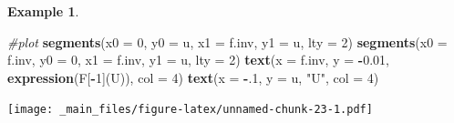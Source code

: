 \documentclass[
]{book}
\newenvironment{Shaded}{\begin{snugshade}}{\end{snugshade}}
\newcommand{\AttributeTok}[1]{\textcolor[rgb]{0.13,0.29,0.53}{#1}}
\newcommand{\CommentTok}[1]{\textcolor[rgb]{0.56,0.35,0.01}{\textit{#1}}}
\newcommand{\DecValTok}[1]{\textcolor[rgb]{0.00,0.00,0.81}{#1}}
\newcommand{\FloatTok}[1]{\textcolor[rgb]{0.00,0.00,0.81}{#1}}
\newcommand{\FunctionTok}[1]{\textcolor[rgb]{0.13,0.29,0.53}{\textbf{#1}}}
\newcommand{\NormalTok}[1]{#1}
\newcommand{\SpecialCharTok}[1]{\textcolor[rgb]{0.81,0.36,0.00}{\textbf{#1}}}
\newcommand{\StringTok}[1]{\textcolor[rgb]{0.31,0.60,0.02}{#1}}
\theoremstyle{definition}
\theoremstyle{definition}
\newtheorem{example}{Example}[chapter]
\theoremstyle{definition}
\theoremstyle{definition}
\theoremstyle{remark}
\begin{document}
\begin{example}
\begin{Shaded}
\begin{Highlighting}[]
\CommentTok{\#plot }
\FunctionTok{segments}\NormalTok{(}\AttributeTok{x0 =} \DecValTok{0}\NormalTok{, }\AttributeTok{y0 =}\NormalTok{ u, }\AttributeTok{x1 =}\NormalTok{ f.inv, }\AttributeTok{y1 =}\NormalTok{ u, }\AttributeTok{lty =} \DecValTok{2}\NormalTok{)}
\FunctionTok{segments}\NormalTok{(}\AttributeTok{x0 =}\NormalTok{ f.inv, }\AttributeTok{y0 =} \DecValTok{0}\NormalTok{, }\AttributeTok{x1 =}\NormalTok{ f.inv, }\AttributeTok{y1 =}\NormalTok{ u, }\AttributeTok{lty =} \DecValTok{2}\NormalTok{)}
\FunctionTok{text}\NormalTok{(}\AttributeTok{x =}\NormalTok{ f.inv, }\AttributeTok{y =} \SpecialCharTok{{-}}\FloatTok{0.01}\NormalTok{, }\FunctionTok{expression}\NormalTok{(F[}\SpecialCharTok{{-}}\DecValTok{1}\NormalTok{](U)), }\AttributeTok{col =} \DecValTok{4}\NormalTok{)}
\FunctionTok{text}\NormalTok{(}\AttributeTok{x =} \SpecialCharTok{{-}}\NormalTok{.}\DecValTok{1}\NormalTok{, }\AttributeTok{y =}\NormalTok{ u, }\StringTok{"U"}\NormalTok{, }\AttributeTok{col =} \DecValTok{4}\NormalTok{)}
\end{Highlighting}
\end{Shaded}

\texttt{[image: \_main\_files/figure-latex/unnamed-chunk-23-1.pdf]}
\end{example}
\end{document}
